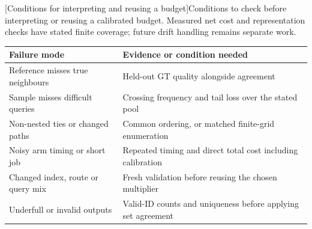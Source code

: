 \par\medskip\noindent\begin{minipage}{\linewidth}
\centering\captionsetup{hypcap=false}
[Conditions for interpreting and reusing a budget]{Conditions to check before interpreting or reusing a calibrated
budget. Measured net cost and representation checks have stated finite coverage;
future drift handling remains separate work.}
\label{tab:6-scope}
\footnotesize\setlength{\tabcolsep}{4pt}
\begin{tabularx}{\linewidth}{@{}*{2}{>{\raggedright\arraybackslash}X}@{}}
\toprule
Failure mode & Evidence or condition needed \\
\midrule
Reference misses true neighbours & Held-out GT quality alongside agreement \\
Sample misses difficult queries & Crossing frequency and tail loss over the stated pool \\
Non-nested ties or changed paths & Common ordering, or matched finite-grid enumeration \\
Noisy arm timing or short job & Repeated timing and direct total cost including calibration \\
Changed index, route or query mix & Fresh validation before reusing the chosen multiplier \\
Underfull or invalid outputs & Valid-ID counts and uniqueness before applying set agreement \\
\bottomrule
\end{tabularx}
\end{minipage}\par\medskip
